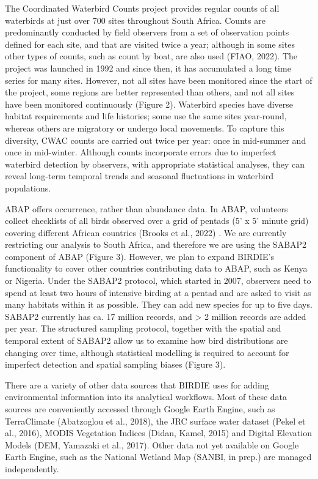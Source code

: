 \documentclass[utf8]{frontiersSCNS}
\begin{document}
The Coordinated Waterbird Counts project provides regular counts of all
waterbirds at just over 700 sites throughout South Africa. Counts are
predominantly conducted by field observers from a set of observation
points defined for each site, and that are visited twice a year;
although in some sites other types of counts, such as count by boat, are
also used (FIAO, 2022). The project was launched in 1992 and since then,
it has accumulated a long time series for many sites. However, not all
sites have been monitored since the start of the project, some regions
are better represented than others, and not all sites have been
monitored continuously (Figure 2). Waterbird species have diverse
habitat requirements and life histories; some use the same sites
year-round, whereas others are migratory or undergo local movements. To
capture this diversity, CWAC counts are carried out twice per year: once
in mid-summer and once in mid-winter. Although counts incorporate errors
due to imperfect waterbird detection by observers, with appropriate
statistical analyses, they can reveal long-term temporal trends and
seasonal fluctuations in waterbird populations.

ABAP offers occurrence, rather than abundance data. In ABAP, volunteers
collect checklists of all birds observed over a grid of pentads (5' x 5'
minute grid) covering different African countries (Brooks et al., 2022)
. We are currently restricting our analysis to South Africa, and
therefore we are using the SABAP2 component of ABAP (Figure 3). However,
we plan to expand BIRDIE's functionality to cover other countries
contributing data to ABAP, such as Kenya or Nigeria. Under the SABAP2
protocol, which started in 2007, observers need to spend at least two
hours of intensive birding at a pentad and are asked to visit as many
habitats within it as possible. They can add new species for up to five
days. SABAP2 currently has ca. 17 million records, and \textgreater{} 2
million records are added per year. The structured sampling protocol,
together with the spatial and temporal extent of SABAP2 allow us to
examine how bird distributions are changing over time, although
statistical modelling is required to account for imperfect detection and
spatial sampling biases (Figure 3).

There are a variety of other data sources that BIRDIE uses for adding
environmental information into its analytical workflows. Most of these
data sources are conveniently accessed through Google Earth Engine, such
as TerraClimate (Abatzoglou et al., 2018), the JRC surface water dataset
(Pekel et al., 2016), MODIS Vegetation Indices (Didan, Kamel, 2015) and
Digital Elevation Models (DEM, Yamazaki et al., 2017). Other data not
yet available on Google Earth Engine, such as the National Wetland Map
(SANBI, in prep.) are managed independently.
\end{document}

